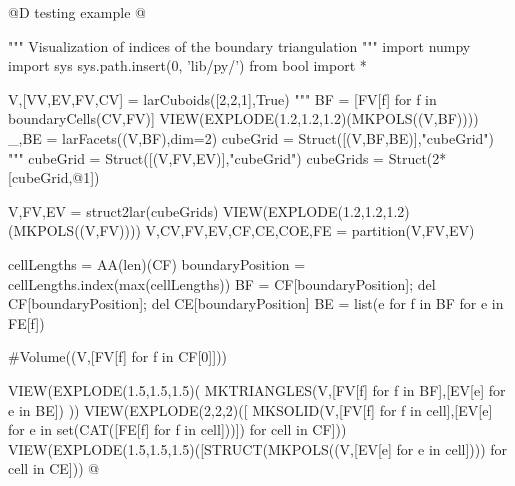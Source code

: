 \documentclass[11pt,oneside]{article}    %
\begin{document}
@D testing example @{
""" Visualization of indices of the boundary triangulation """
import numpy
import sys
sys.path.insert(0, 'lib/py/')
from bool import *

V,[VV,EV,FV,CV] = larCuboids([2,2,1],True)
"""
BF = [FV[f] for f in boundaryCells(CV,FV)]
VIEW(EXPLODE(1.2,1.2,1.2)(MKPOLS((V,BF))))
_,BE = larFacets((V,BF),dim=2)
cubeGrid = Struct([(V,BF,BE)],"cubeGrid")
"""
cubeGrid = Struct([(V,FV,EV)],"cubeGrid")
cubeGrids = Struct(2*[cubeGrid,@1])

V,FV,EV = struct2lar(cubeGrids)
VIEW(EXPLODE(1.2,1.2,1.2)(MKPOLS((V,FV))))
V,CV,FV,EV,CF,CE,COE,FE = partition(V,FV,EV)

cellLengths = AA(len)(CF)
boundaryPosition = cellLengths.index(max(cellLengths))
BF = CF[boundaryPosition]; del CF[boundaryPosition]; del CE[boundaryPosition]
BE = list({e for f in BF for e in FE[f]})

#Volume((V,[FV[f] for f in CF[0]]))

VIEW(EXPLODE(1.5,1.5,1.5)( MKTRIANGLES(V,[FV[f] for f in BF],[EV[e] for e in BE]) ))
VIEW(EXPLODE(2,2,2)([ MKSOLID(V,[FV[f] for f in cell],[EV[e] for e in set(CAT([FE[f] for f in cell]))]) for cell in CF]))
VIEW(EXPLODE(1.5,1.5,1.5)([STRUCT(MKPOLS((V,[EV[e] for e in cell]))) for cell in CE]))
@}
\end{document}
